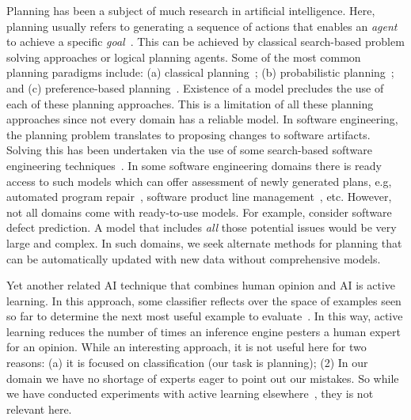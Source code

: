 Planning  has been a subject of much research in artificial intelligence. Here, planning usually refers to generating a sequence of actions that enables an \textit{agent} to achieve a specific \textit{goal}~\cite{norvig}. This can be achieved by classical search-based problem solving  approaches or logical planning agents. Some of the most common planning paradigms include: (a) classical planning~\cite{wooldridge95}; (b) probabilistic planning~\cite{altman99}; and (c) preference-based planning~\cite{baier09}. Existence of a model precludes the use of each of these planning approaches. This is a limitation of all these planning approaches since not every domain has a reliable model. In software engineering, the planning problem translates to proposing changes to software artifacts. Solving this has been undertaken via the use of some search-based software engineering techniques~\cite{Harman2009}. In some software engineering domains there is ready access to such models which can offer assessment of newly generated plans, e.g, automated program repair~\cite{Weimer2009, LeGoues2015}, software product line management~\cite{sayyad13, henard15}, etc. However, not all domains come with ready-to-use models. For example, consider software defect prediction. A model that includes {\em all} those potential issues would be very large and complex. In such domains, we seek alternate methods for planning that can be automatically updated with new data without comprehensive models. 

Yet another related AI technique that combines human opinion and AI is active learning. In this approach, some classifier reflects
over the space of examples seen so far to determine the next most useful example to evaluate~\cite{YuKM16}. In this way, active learning reduces
the number of times an inference engine pesters a human expert for an opinion. While an interesting approach, it is not useful here for two reasons: (a) it is focused on classification (our task is planning); (2) In our domain we have no shortage of experts eager to point out our mistakes. So while we have conducted experiments with active learning elsewhere~\cite{YuKM16}, they is not relevant here.



% 
%
%


